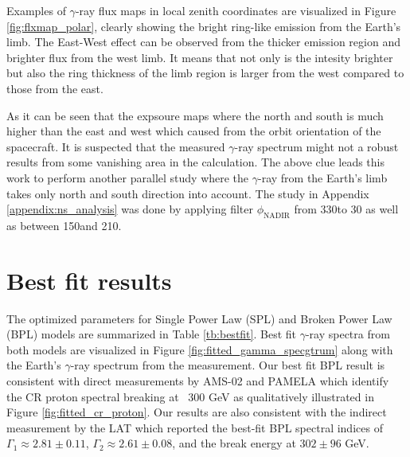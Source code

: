 Examples of $\gamma$-ray flux maps in local zenith coordinates
are visualized in Figure \ref{fig:flxmap_polar}, clearly showing
the bright ring-like emission from the Earth's limb.
The East-West effect can be observed from the thicker emission region
and brighter flux from the west limb.
It means that not only is the intesity brighter
but also the ring thickness
of the limb region is larger from the west compared to those from the east.


As it can be seen that the expsoure maps where the north and south is 
much higher than the east and west which caused from the orbit 
orientation of the spacecraft. It is suspected 
that the measured $\gamma$-ray spectrum might not a robust results 
from some vanishing area in the calculation. The above clue leads
this work to perform another parallel study where the $\gamma$-ray 
from the Earth's limb takes only north and south direction into account.
The study in Appendix \ref{appendix:ns_analysis} was done by applying 
filter $\phi_\text{NADIR}$ from 330\textdegree to 30 \textdegree
as well as between 150\textdegree and 210\textdegree.


\section{Best fit results}

The optimized parameters for Single Power Law (SPL)
and Broken Power Law (BPL) models are summarized in 
Table \ref{tb:bestfit}. Best fit $\gamma$-ray 
spectra from both models are
visualized in Figure \ref{fig:fitted_gamma_specgtrum} along
with the Earth's $\gamma$-ray spectrum from the measurement.
Our best fit BPL result is consistent with direct measurements
by AMS-02 \citep{AMS02pr2015} and PAMELA \citep{adriani2011pamela}
which identify
the CR proton spectral breaking at ~300 GeV as qualitatively
illustrated in Figure \ref{fig:fitted_cr_proton}.
Our results are also consistent with the indirect measurement
by the LAT \cite{FermiEarth14} which reported the best-fit BPL spectral
indices of $\Gamma_1\approx2.81\pm0.11$, $\Gamma_2\approx2.61\pm0.08$,
and the break energy at $302\pm96$ GeV.

